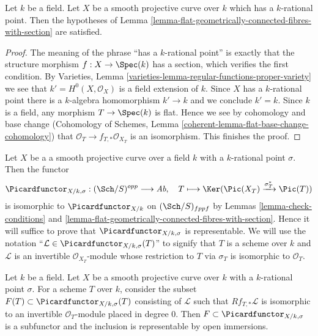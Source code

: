 \begin{lemma}
\label{lemma-check-conditions}
Let $k$ be a field. Let $X$ be a smooth projective curve over $k$
which has a $k$-rational point. Then the hypotheses of
Lemma \ref{lemma-flat-geometrically-connected-fibres-with-section}
are satisfied.
\end{lemma}

\begin{proof}
The meaning of the phrase ``has a $k$-rational point'' is exactly that
the structure morphism $f : X \to \Spec(k)$ has a section, which
verifies the first condition.
By Varieties, Lemma \ref{varieties-lemma-regular-functions-proper-variety}
we see that $k' = H^0(X, \mathcal{O}_X)$ is a field extension of $k$.
Since $X$ has a $k$-rational point there is a $k$-algebra homomorphism
$k' \to k$ and we conclude $k' = k$.
Since $k$ is a field, any morphism $T \to \Spec(k)$ is flat.
Hence we see by cohomology and base change
(Cohomology of Schemes, Lemma \ref{coherent-lemma-flat-base-change-cohomology})
that $\mathcal{O}_T \to f_{T, *}\mathcal{O}_{X_T}$ is an isomorphism.
This finishes the proof.
\end{proof}

\noindent
Let $X$ be a a smooth projective curve over a field $k$ with a
$k$-rational point $\sigma$. Then the functor
$$
\Picardfunctor_{X/k, \sigma} : (\Sch/S)^{opp} \longrightarrow \textit{Ab},\quad
T \longmapsto \Ker(\Pic(X_T) \xrightarrow{\sigma_T^*} \Pic(T))
$$
is isomorphic to $\Picardfunctor_{X/k}$ on $(\Sch/S)_{fppf}$
by Lemmas \ref{lemma-check-conditions} and
\ref{lemma-flat-geometrically-connected-fibres-with-section}.
Hence it will suffice to prove that $\Picardfunctor_{X/k, \sigma}$
is representable. We will use the notation
``$\mathcal{L} \in \Picardfunctor_{X/k, \sigma}(T)$'' to signify that
$T$ is a scheme over $k$ and $\mathcal{L}$ is an invertible
$\mathcal{O}_{X_T}$-module whose restriction to $T$ via $\sigma_T$
is isomorphic to $\mathcal{O}_T$.

\begin{lemma}
\label{lemma-define-open}
Let $k$ be a field. Let $X$ be a smooth projective curve over $k$
with a $k$-rational point $\sigma$. For a scheme $T$ over $k$,
consider the subset $F(T) \subset \Picardfunctor_{X/k, \sigma}(T)$ consisting of
$\mathcal{L}$ such that $Rf_{T, *}\mathcal{L}$ is isomorphic to an invertible
$\mathcal{O}_T$-module placed in degree $0$. Then
$F \subset \Picardfunctor_{X/k, \sigma}$ is a subfunctor and the inclusion is
representable by open immersions.
\end{lemma}

